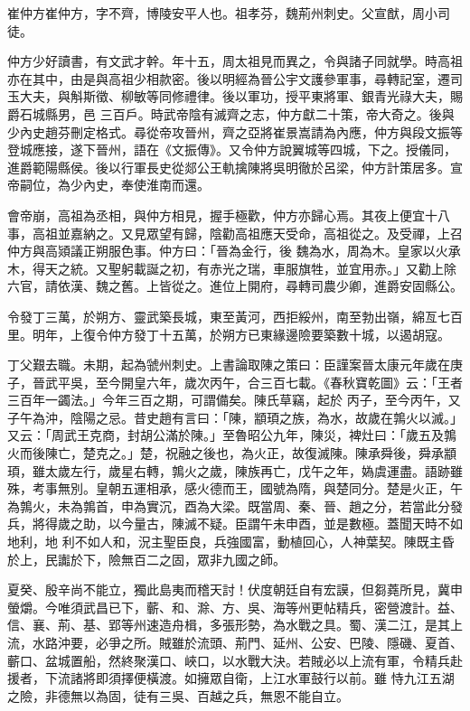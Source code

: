 
\begin{pinyinscope}

 崔仲方崔仲方，字不齊，博陵安平人也。祖孝芬，魏荊州刺史。父宣猷，周小司徒。



 仲方少好讀書，有文武才幹。年十五，周太祖見而異之，令與諸子同就學。時高祖亦在其中，由是與高祖少相款密。後以明經為晉公宇文護參軍事，尋轉記室，遷司玉大夫，與斛斯徵、柳敏等同修禮律。後以軍功，授平東將軍、銀青光祿大夫，賜爵石城縣男，邑
 三百戶。時武帝陰有滅齊之志，仲方獻二十策，帝大奇之。後與少內史趙芬刪定格式。尋從帝攻晉州，齊之亞將崔景嵩請為內應，仲方與段文振等登城應接，遂下晉州，語在《文振傳》。又令仲方說翼城等四城，下之。授儀同，進爵範陽縣侯。後以行軍長史從郯公王軌擒陳將吳明徹於呂梁，仲方計策居多。宣帝嗣位，為少內史，奉使淮南而還。



 會帝崩，高祖為丞相，與仲方相見，握手極歡，仲方亦歸心焉。其夜上便宜十八事，高祖並嘉納之。又見眾望有歸，陰勸高祖應天受命，高祖從之。及受禪，上召仲方與高熲議正朔服色事。仲方曰：「晉為金行，後
 魏為水，周為木。皇家以火承木，得天之統。又聖躬載誕之初，有赤光之瑞，車服旗牲，並宜用赤。」又勸上除六官，請依漢、魏之舊。上皆從之。進位上開府，尋轉司農少卿，進爵安固縣公。



 令發丁三萬，於朔方、靈武築長城，東至黃河，西拒綏州，南至勃出嶺，綿亙七百里。明年，上復令仲方發丁十五萬，於朔方已東緣邊險要築數十城，以遏胡寇。



 丁父艱去職。未期，起為虢州刺史。上書論取陳之策曰：臣謹案晉太康元年歲在庚子，晉武平吳，至今開皇六年，歲次丙午，合三百七載。《春秋寶乾圖》云：「王者三百年一蠲法。」今年三百之期，可謂備矣。陳氏草竊，起於
 丙子，至今丙午，又子午為沖，陰陽之忌。昔史趙有言曰：「陳，顓頊之族，為水，故歲在鶉火以滅。」又云：「周武王克商，封胡公滿於陳。」至魯昭公九年，陳災，裨灶曰：「歲五及鶉火而後陳亡，楚克之。」楚，祝融之後也，為火正，故復滅陳。陳承舜後，舜承顓頊，雖太歲左行，歲星右轉，鶉火之歲，陳族再亡，戊午之年，媯虞運盡。語跡雖殊，考事無別。皇朝五運相承，感火德而王，國號為隋，與楚同分。楚是火正，午為鶉火，未為鶉首，申為實沉，酉為大梁。既當周、秦、晉、趙之分，若當此分發兵，將得歲之助，以今量古，陳滅不疑。臣謂午未申酉，並是數極。蓋聞天時不如地利，地
 利不如人和，況主聖臣良，兵強國富，動植回心，人神葉契。陳既主昏於上，民讟於下，險無百二之固，眾非九國之師。



 夏癸、殷辛尚不能立，獨此島夷而稽天討！伏度朝廷自有宏謨，但芻蕘所見，冀申螢爝。今唯須武昌已下，蘄、和、滁、方、吳、海等州更帖精兵，密營渡計。益、信、襄、荊、基、郢等州速造舟楫，多張形勢，為水戰之具。蜀、漢二江，是其上流，水路沖要，必爭之所。賊雖於流頭、荊門、延州、公安、巴陵、隱磯、夏首、蘄口、盆城置船，然終聚漢口、峽口，以水戰大決。若賊必以上流有軍，令精兵赴援者，下流諸將即須擇便橫渡。如擁眾自衛，上江水軍鼓行以前。雖
 恃九江五湖之險，非德無以為固，徒有三吳、百越之兵，無恩不能自立。




\end{pinyinscope}
